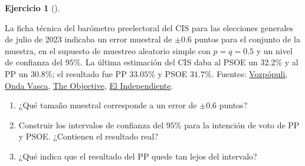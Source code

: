 \documentclass[
  spanish,
  a4paper,
]{scrreport}
\theoremstyle{definition}
\newtheorem{exercise}{Ejercicio}[chapter]
\theoremstyle{remark}
\begin{document}
\begin{exercise}[]\protect\hypertarget{exr-interpretacion-cis-23j}{}\label{exr-interpretacion-cis-23j}

La ficha técnica del barómetro preelectoral del CIS para las elecciones
generales de julio de 2023 indicaba un error muestral de \(\pm 0.6\)
puntos para el conjunto de la muestra, en el supuesto de muestreo
aleatorio simple con \(p=q=0.5\) y un nivel de confianza del \(95\)\%.
La última estimación del CIS daba al PSOE un \(32.2\)\% y al PP un
\(30.8\)\%; el resultado fue PP \(33.05\)\% y PSOE \(31.7\)\%. Fuentes:
\href{https://www.vozpopuli.com/espana/elecciones-generales-2023/encuesta-cis-elecciones-generales-23j-pp-vox.html}{Vozpópuli},
\href{https://www.ondavasca.com/tezanos-tras-el-23j-todas-las-encuestas-fallaron-menos-el-cis/}{Onda
Vasca},
\href{https://theobjective.com/espana/politica/2023-07-23/fracaso-historico-encuestas-cis/}{The
Objective},
\href{https://www.elindependiente.com/espana/2024/02/11/la-querencia-de-tezanos-a-infravalorar-al-pp-el-otro-examen-del-18-f-en-galicia/amp/}{El
Independiente}.

\begin{enumerate}
\def\labelenumi{\alph{enumi}.}
\item
  ¿Qué tamaño muestral corresponde a un error de \(\pm 0.6\) puntos?
\item
  Construir los intervalos de confianza del \(95\)\% para la intención
  de voto de PP y PSOE. ¿Contienen el resultado real?
\item
  ¿Qué indica que el resultado del PP quede tan lejos del intervalo?
\end{enumerate}

\end{exercise}
\end{document}
